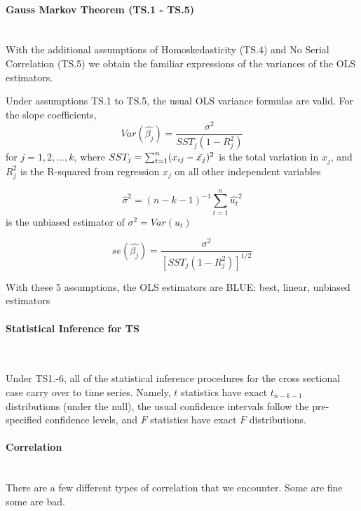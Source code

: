 \documentclass[11pt]{article}
\begin{document}
\paragraph{Gauss Markov Theorem (TS.1 - TS.5) } \mbox{} \\
With the additional assumptions of Homoskedasticity (TS.4) and No Serial Correlation (TS.5) we obtain the familiar expressions of the variances of the OLS estimators.


\begin{theorem}
Under assumptions TS.1 to TS.5, the usual OLS variance formulas are valid. For the slope coefficients,
\[Var(\hat{\beta_j}) = \dfrac{\sigma^2}{SST_j (1-R^2_j)}\]
for $j = 1,2, \ldots, k$, where $SST_j = \sum_{t=1}^n (x_{ij}- \Bar{x_j})^2$ is the total variation in $x_j$, and $R_j^2$ is the R-squared from regression $x_j$ on all other independent variables

\[\hat{\sigma}^2 = (n-k-1)^{-1} \sum_{t=1}^n \hat{u_t}^2\]
is the unbiased estimator of $\sigma^2 = Var(u_t)$

\[se(\hat{\beta_j}) = \dfrac{\sigma^2}{\left[ SST_j(1-R_j^2)\right]^{1/2}}\]

With these 5 assumptions, the OLS estimators are BLUE: best, linear, unbiased estimators
\end{theorem}
\paragraph{Statistical Inference for TS} \mbox{} \\

\begin{theorem}
    Under TS1.-6, all of the statistical inference procedures for the cross sectional case carry over to time series. Namely, $t$ statistics have exact $t_{n-k-1}$ distributions (under the null), the usual confidence intervals follow the pre-specified confidence levels, and $F$ statistics have exact $F$ distributions.
\end{theorem}



\paragraph{Correlation} \mbox{} \\

There are a few different types of correlation that we encounter. Some are fine some are bad.
\end{document}

